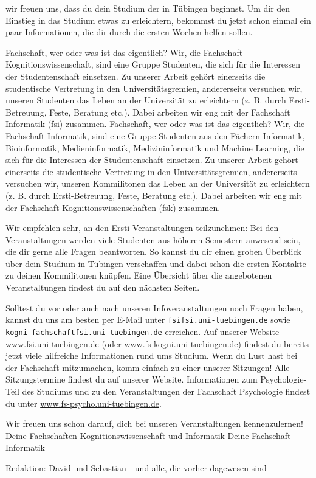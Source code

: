 \thispagestyle{firststyle}
wir freuen uns, dass du dein Studium der \studiengang in Tübingen beginnst.
Um dir den Einstieg in das Studium etwas zu erleichtern, bekommst du jetzt schon einmal
ein paar Informationen, die dir durch die ersten Wochen helfen sollen.

\ifkogwiss
\glqq Fachschaft\grqq, wer oder was ist das eigentlich? Wir, die Fachschaft Kognitionswissenschaft,
sind eine Gruppe Studenten, die sich für die Interessen der Studentenschaft einsetzen. Zu unserer Arbeit
gehört einerseits die studentische Vertretung in den Universitätsgremien, andererseits versuchen wir, unseren
Studenten das Leben an der Universität zu erleichtern (z. B. durch Ersti-Betreuung, Feste, Beratung etc.).
Dabei arbeiten wir eng mit der Fachschaft Informatik (fsi) zusammen.
\else
\glqq Fachschaft\grqq, wer oder was ist das eigentlich? Wir, die Fachschaft Informatik, sind eine Gruppe Studenten aus den Fächern
Informatik, Bioinformatik, Medieninformatik, Medizininformatik und Machine Learning, die sich für die Interessen der Studentenschaft einsetzen. Zu unserer Arbeit
gehört einerseits die studentische Vertretung in den Universitätsgremien, andererseits versuchen wir, unseren
Kommilitonen das Leben an der Universität zu erleichtern (z. B. durch Ersti-Betreuung, Feste, Beratung etc.).
Dabei arbeiten wir eng mit der Fachschaft Kognitionswissenschaften (fsk) zusammen.
\fi

Wir empfehlen sehr, an den Ersti-Veranstaltungen teilzunehmen:
Bei den Veranstaltungen werden viele Studenten aus höheren Semestern anwesend sein, die dir gerne alle Fragen beantworten.
So kannst du dir einen groben Überblick über dein Studium in Tübingen verschaffen und dabei schon die ersten Kontakte zu deinen Kommilitonen knüpfen.
Eine Übersicht über die angebotenen Veranstaltungen findest du auf den nächsten Seiten.

Solltest du vor oder auch nach unseren Infoveranstaltungen noch Fragen haben, kannst du uns
am besten per E-Mail unter \texttt{fsi\At fsi.uni-tuebingen.de}
\ifkogwiss
sowie \texttt{kogni-fachschaft\At fsi.uni-tuebingen.de}
\fi
erreichen.
Auf unserer Website \url{www.fsi.uni-tuebingen.de} \ifkogwiss (oder \url{www.fs-kogni.uni-tuebingen.de}) \fi findest du bereits
jetzt viele hilfreiche Informationen rund ums Studium. Wenn du Lust hast bei der Fachschaft mitzumachen,
komm einfach zu einer unserer Sitzungen! Alle Sitzungstermine findest du auf unserer Website.
\ifkogwiss Informationen zum Psychologie-Teil des Studiums und zu den Veranstaltungen der
Fachschaft Psychologie findest du unter \url{www.fs-psycho.uni-tuebingen.de}.\fi

\enlargethispage{3\baselineskip} %
Wir freuen uns schon darauf, dich bei unseren Veranstaltungen kennenzulernen!\\
\ifkogwiss
Deine Fachschaften Kognitionswissenschaft und Informatik
\else
Deine Fachschaft Informatik
\par\hfill
{\footnotesize Redaktion: David und Sebastian - und alle, die vorher dagewesen sind}
\fi
\vfill
